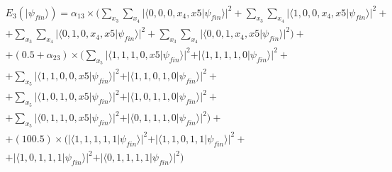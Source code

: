 \begin{equation}
\begin{split}
E_{3}(\vert\psi_{fin}\rangle)=\alpha_{13}\times(\sum_{x_{3}}\sum_{x_{4}}\vert\langle0,0,0,x_{4},x{5}\vert\psi_{fin}\rangle\vert^{2} + \sum_{x_{3}}\sum_{x_{4}}\vert\langle1,0,0,x_{4},x{5}\vert\psi_{fin}\rangle\vert^{2} + \\ 
+ \sum_{x_{3}}\sum_{x_{4}}\vert\langle0,1,0,x_{4},x{5}\vert\psi_{fin}\rangle\vert^{2}
+ \sum_{x_{3}}\sum_{x_{4}}\vert\langle0,0,1,x_{4},x{5}\vert\psi_{fin}\rangle\vert^{2}
 ) + \\
 + (0.5 + \alpha_{23})\times(\sum_{x_{5}}\vert\langle1,1,1,0,x{5}\vert\psi_{fin}\rangle\vert^{2} + \vert\langle1,1,1,1,0\vert\psi_{fin}\rangle\vert^{2} + \\ + \sum_{x_{5}}\vert\langle1,1,0,0,x{5}\vert\psi_{fin}\rangle\vert^{2}+ \vert\langle1,1,0,1,0\vert\psi_{fin}\rangle\vert^{2} + \\ 
+ \sum_{x_{5}}\vert\langle1,0,1,0,x{5}\vert\psi_{fin}\rangle\vert^{2} + \vert\langle1,0,1,1,0\vert\psi_{fin}\rangle\vert^{2}
+ \\ + \sum_{x_{5}}\vert\langle0,1,1,0,x{5}\vert\psi_{fin}\rangle\vert^{2} + \vert\langle0,1,1,1,0\vert\psi_{fin}\rangle\vert^{2}
 )  + \\
 + (100.5)\times(\vert\langle1,1,1,1,1\vert\psi_{fin}\rangle\vert^{2} + \vert\langle1,1,0,1,1\vert\psi_{fin}\rangle\vert^{2} + \\ 
+ \vert\langle1,0,1,1,1\vert\psi_{fin}\rangle\vert^{2}
+ \vert\langle0,1,1,1,1\vert\psi_{fin}\rangle\vert^{2}
 )
\end{split}
\label{eq:pirates_payoff32:3}
\end{equation}








